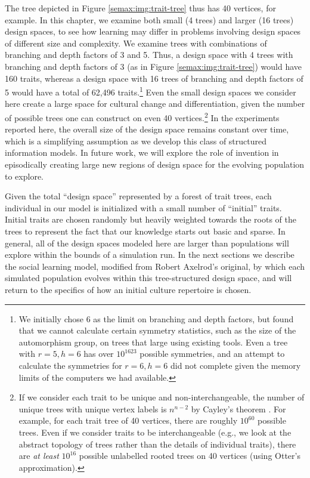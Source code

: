The tree depicted in Figure \ref{semax:img:trait-tree} thus has 40 vertices,
for example. In this chapter, we examine both small (4 trees) and larger
(16 trees) design spaces, to see how learning may differ in problems
involving design spaces of different size and complexity. We examine
trees with combinations of branching and depth factors of 3 and 5. Thus,
a design space with 4 trees with branching and depth factors of 3 (as in
Figure \ref{semax:img:trait-tree}) would have 160 traits, whereas a design
space with 16 trees of branching and depth factors of 5 would have a
total of 62,496 traits.\footnote{We initially chose 6 as the limit on
  branching and depth factors, but found that we cannot calculate
  certain symmetry statistics, such as the size of the automorphism
  group, on trees that large using existing tools. Even a tree with
  $r=5, h=6$ has over $10^{1623}$ possible symmetries, and an attempt to
  calculate the symmetries for $r=6, h=6$ did not complete given the
  memory limits of the computers we had available.} Even the small
design spaces we consider here create a large space for cultural change
and differentiation, given the number of possible trees one can
construct on even 40 vertices.\footnote{If we consider each trait to be
  unique and non-interchangeable, the number of unique trees with unique
  vertex labels is $n^{n-2}$ by Cayley's theorem
  \citep{diestel2010graph}. For example, for each trait tree of 40
  vertices, there are roughly $10^{60}$ possible trees. Even if we
  consider traits to be interchangeable (e.g., we look at the abstract
  topology of trees rather than the details of individual traits), there
  are \emph{at least} $10^{16}$ possible unlabelled rooted trees on 40
  vertices (using Otter's \citeyearpar{otter1948number} approximation).}
In the experiments reported here, the overall size of the design space
remains constant over time, which is a simplifying assumption as we
develop this class of structured information models. In future work, we
will explore the role of invention in episodically creating large new
regions of design space for the evolving population to explore.

Given the total ``design space'' represented by a forest of trait trees,
each individual in our model is initialized with a small number of
``initial'' traits. Initial traits are chosen randomly but heavily
weighted towards the roots of the trees to represent the fact that our
knowledge starts out basic and sparse. In general, all of the design
spaces modeled here are larger than populations will explore within the
bounds of a simulation run. In the next sections we describe the social
learning model, modified from Robert Axelrod's original, by which each
simulated population evolves within this tree-structured design space,
and will return to the specifics of how an initial culture repertoire is
chosen.

